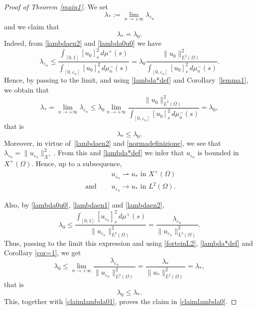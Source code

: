 \documentclass[12pt,a4paper,intlimits,sumlimits]{amsart}
\theoremstyle{definition}
\theoremstyle{plain}
\numberwithin{equation}{section}
\renewcommand{\leq}{\leqslant}
\renewcommand{\le}{\leqslant}
\begin{document}
\begin{proof}[Proof of Theorem \ref{main1}]
We set
\begin{equation}\label{lambda*def}
\lambda_*:=\lim_{n\to +\infty}\lambda_{\varepsilon_n}
\end{equation}
and we claim that
\begin{equation}\label{claimlambda0}
\lambda_*=\lambda_0. 
\end{equation}
Indeed, from \eqref{lambdaen2} and \eqref{lambda0u0} we have
\[
\lambda_{\varepsilon_n}\leq \dfrac{\displaystyle\int_{[0, 1]} [u_0]^2_s \, d\mu^+(s)}{\displaystyle \int_{[0,\varepsilon_n] } [u_0]^2_s \, d\mu_n^-(s)}= \lambda_0  \dfrac{\|u_0\|^2_{L^2(\Omega)}}{\displaystyle \int_{[0,\varepsilon_n] } [u_0]^2_s \, d\mu_n^-(s)}.
\]
Hence, by passing to the limit, and using \eqref{lambda*def} and Corollary~\ref{lemma1}, we obtain that
\[
\lambda_* =\lim_{n\to +\infty}\lambda_{\varepsilon_n}\le \lambda_0 \lim_{n\to +\infty} \dfrac{\|u_0\|^2_{L^2(\Omega)}}{\displaystyle \int_{[0,\varepsilon_n] } [u_0]^2_s \, d\mu_n^-(s)} = \lambda_0,
\]
that is
\begin{equation}\label{claimlambda01}
\lambda_*\leq \lambda_0.
\end{equation}
Moreover, in virtue of~\eqref{lambdaen2} and \eqref{normadefinizione}, we see that $\lambda_{\varepsilon_n}=\|u_{\varepsilon_n}\|^2_{X^+}$.  From this and \eqref{lambda*def} we infer that $u_{\varepsilon_n}$ is bounded in $X^+(\Omega)$.
Hence, up to a subsequence, 
\begin{align}\label{deboleinX+}
&u_{\varepsilon_n}\rightharpoonup u_* \mbox{ in } X^+(\Omega)\\ \label{forteinL2}
\mbox{ and }\quad & u_{\varepsilon_n}\to u_* \mbox{ in } L^2(\Omega).
\end{align}


Also, by \eqref{lambda0u0}, \eqref{lambdaen1} and \eqref{lambdaen2},
\[
\lambda_0\leq \dfrac{\displaystyle\int_{[0, 1]} [u_{\varepsilon_n}]^2_s \, d\mu^+(s)}{\|u_{\varepsilon_n}\|^2_{L^2(\Omega)}} =\frac{\lambda_{\varepsilon_n}}{\|u_{\varepsilon_n}\|^2_{L^2(\Omega)}}.
\]
Thus, passing to the limit this expression and using \eqref{forteinL2}, \eqref{lambda*def} and Corollary \ref{cor=1}, we get
\[
\lambda_0\le\lim_{n\to +\infty} \frac{\lambda_{\varepsilon_n}}{\|u_{\varepsilon_n}\|^2_{L^2(\Omega)}} = \frac{\lambda_*}{\|u_*\|^2_{L^2(\Omega)}}=\lambda_*,
\]
that is
\[
\lambda_0 \le\lambda_*.
\]
This, together with \eqref{claimlambda01},  proves the claim in \eqref{claimlambda0}. 


\end{proof}
\end{document}
